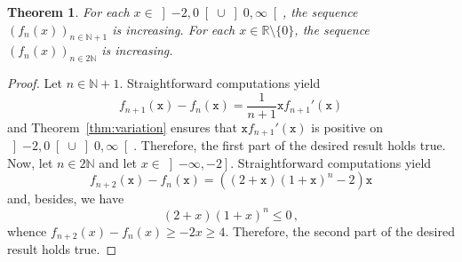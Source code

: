 \documentclass[12pt]{article}
\newcommand{\bR}{\mathbb{R}}
\newcommand{\bN}{\mathbb{N}}
\newcommand{\gtint}[1]{\left] #1, \infty \right[}
\newcommand{\leint}[1]{\left]- \infty, #1 \right]}
\newcommand{\ttx}{\mathtt{x}}
\newtheorem{theorem}{Theorem}
\begin{document}
\begin{theorem} \label{thm:increasing-fn}
  For each $x \in \left]- 2, 0 \right[ \cup \gtint{0}$,
  the sequence $\left( f_n(x) \right)_{n \in \bN + 1}$ is increasing.
  For each $x \in \bR \setminus \{ 0 \}$,
  the sequence $\left( f_n(x)\right)_{n \in 2 \bN}$ is increasing.
\end{theorem} 

\begin{proof}
 Let $n \in \bN + 1$.
 Straightforward computations yield  
 $$
 f_{n+ 1} (\ttx) - f_n(\ttx) = \frac{1}{n + 1} \ttx  f_{n + 1}'(\ttx) 
 $$
 and
 Theorem~\ref{thm:variation} ensures that $\ttx f_{n + 1}'(\ttx)$ is positive on $\left]- 2, 0 \right[ \cup \gtint{0}$.
 Therefore, the first part of the desired result holds true.
 Now, let $n \in 2 \bN$ and let $x \in \leint{-2}$.
 Straightforward computations yield  
 $$
 f_{n + 2}(\ttx) - f_n(\ttx) =  \left(  (2 + \ttx) {(1 + \ttx)}^n - 2 \right) \ttx
 $$
 and, besides, we have
 $$
  (2 + x) {(1 + x)}^n \le 0 \,, 
 $$
 whence $f_{n + 2}(x) - f_n(x) \ge - 2 x   \ge 4$.
 Therefore, the second part of the desired result holds true.
\end{proof} 
\end{document}
